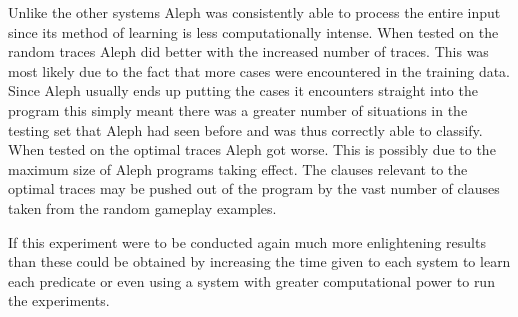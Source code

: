 Unlike the other systems Aleph was consistently able to process the entire input since its method of learning is less computationally intense. When tested on the random traces Aleph did better with the increased number of traces. This was most likely due to the fact that more cases were encountered in the training data. Since Aleph usually ends up putting the cases it encounters straight into the program this simply meant there was a greater number of situations in the testing set that Aleph had seen before and was thus correctly able to classify. When tested on the optimal traces Aleph got worse. This is possibly due to the maximum size of Aleph programs taking effect. The clauses relevant to the optimal traces may be pushed out of the program by the vast number of clauses taken from the random gameplay examples.

If this experiment were to be conducted again much more enlightening results than these could be obtained by increasing the time given to each system to learn each predicate or even using a system with greater computational power to run the experiments. 


